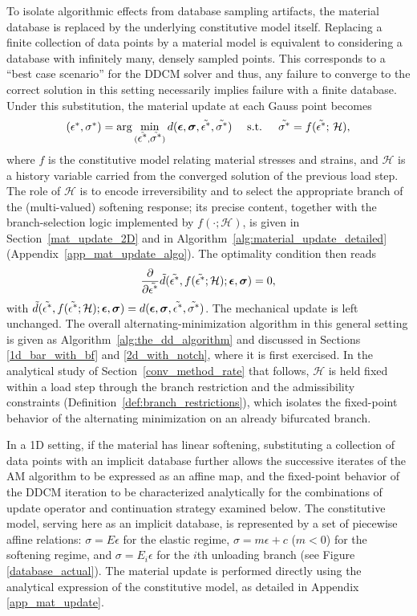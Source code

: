 \documentclass[10pt]{cas-sc}
\newenvironment{addedblock}{}{}
\begin{document}
\begin{addedblock}
To isolate algorithmic effects from database sampling artifacts, the material database is replaced by the underlying constitutive model itself. Replacing a finite collection of data points by a material model is equivalent to considering a database with infinitely many, densely sampled points. This corresponds to a ``best case scenario'' for the DDCM solver and thus, any failure to converge to the correct solution in this setting necessarily implies failure with a finite database. Under this substitution, the material update at each Gauss point becomes
\begin{equation}
	(\mbox{$\epsilon^*$},\mbox{$\sigma^*$}) = \arg \min_{(\tilde{\mbox{$\epsilon^*$}},\tilde{\mbox{$\sigma^*$}})} d(\mbox{\boldmath $\epsilon$},\mbox{\boldmath $\sigma$},\tilde{\mbox{$\epsilon^*$}},\tilde{\mbox{$\sigma^*$}}) \quad \text{   s.t.   }\quad \tilde{\mbox{$\sigma^*$}}=f(\tilde{\mbox{$\epsilon^*$}};\,\mathcal{H}),
\end{equation}
where $f$ is the constitutive model relating material stresses and strains, and $\mathcal{H}$ is a history variable carried from the converged solution of the previous load step. The role of $\mathcal{H}$ is to encode irreversibility and to select the appropriate branch of the (multi-valued) softening response; its precise content, together with the branch-selection logic implemented by $f(\cdot;\mathcal{H})$, is given in Section~\ref{mat_update_2D} and in Algorithm~\ref{alg:material_update_detailed} (Appendix~\ref{app_mat_update_algo}). The optimality condition then reads
\begin{equation}
	{\dfrac{\partial }{\partial \tilde{ \mbox{$\epsilon^*$}}}} \tilde{d}(\tilde{\mbox{$\epsilon^*$}},f(\tilde{\mbox{$\epsilon^*$}};\mathcal{H});\mbox{\boldmath $\epsilon$},\mbox{\boldmath $\sigma$})    =0,
\end{equation}
with $\tilde{d}(\tilde{\mbox{$\epsilon^*$}},f(\tilde{\mbox{$\epsilon^*$}};\mathcal{H});\mbox{\boldmath $\epsilon$},\mbox{\boldmath $\sigma$}) = d(\mbox{\boldmath $\epsilon$},\mbox{\boldmath $\sigma$},\tilde{\mbox{$\epsilon^*$}},\tilde{\mbox{$\sigma^*$}})$. The mechanical update is left unchanged. The overall alternating-minimization algorithm in this general setting is given as Algorithm~\ref{alg:the_dd_algorithm} and discussed in Sections \ref{1d_bar_with_bf} and \ref{2d_with_notch}, where it is first exercised. In the analytical study of Section~\ref{conv_method_rate} that follows, $\mathcal{H}$ is held fixed within a load step through the branch restriction and the admissibility constraints (Definition~\ref{def:branch_restrictions}), which isolates the fixed-point behavior of the alternating minimization on an already bifurcated branch.


In a 1D setting, if the material has linear softening, substituting a collection of data points with an implicit database further allows the successive iterates of the AM algorithm to be expressed as an affine map, and the fixed-point behavior of the DDCM iteration to be characterized analytically for the combinations of update operator and continuation strategy examined below. The constitutive model, serving here as an implicit database, is represented by a set of piecewise affine relations: $\sigma = E\epsilon$ for the elastic regime, $\sigma = m\epsilon + c$ ($m<0$) for the softening regime, and $\sigma = E_i \epsilon$ for the $i$th unloading branch (see Figure \ref{database_actual}). The material update is performed directly using the analytical expression of the constitutive model, as detailed in Appendix \ref{app_mat_update}. 


\end{addedblock}
\end{document}
